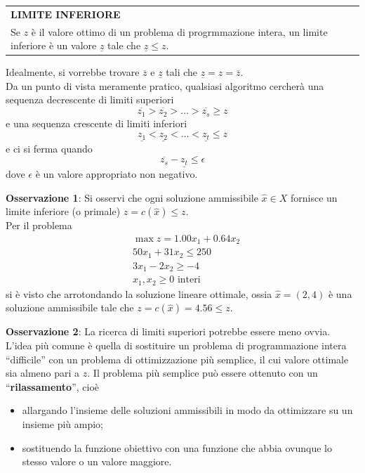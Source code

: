 \documentclass[a4paper]{extarticle}
\newcommand{\quotes}[1]{``#1''}
\renewcommand\arraystretch{}
\begin{document}
\vspace{1em}
\setlength{\tabcolsep}{14pt}
\renewcommand{\arraystretch}{2}
\noindent
\begin{tabularx}{\textwidth}{@{}|P|@{}}
    \hline
    {\textbf{LIMITE INFERIORE}}\\
    \parbox{\linewidth}{Se $z$ è il valore ottimo di un problema di progrmmazione intera, un limite inferiore è un valore $\underline{z}$ tale che $\underline{z} \leq z$. \vspace{3mm}}\\
    \hline
\end{tabularx}

\vspace{1em}
\noindent
Idealmente, si vorrebbe trovare $\overline{z}$ e $\underline{z}$ tali che $\underline{z} = z = \overline{z}$.\\
Da un punto di vista meramente pratico, qualsiasi algoritmo cercherà una sequenza decrescente di limiti superiori
\[\overline{z_1} > \overline{z_2} > \dots > \overline{z_s} \geq z\]
e una sequenza crescente di limiti inferiori 
\[\underline{z_1} < \underline{z_2} < \dots < \underline{z_t} \leq z\]
e ci si ferma quando
\[\overline{z_s} - \underline{z_t} \leq \epsilon\]
dove $\epsilon$ è un valore appropriato non negativo.

\vspace{2em}
\noindent
\textbf{Osservazione 1}: Si osservi che ogni soluzione ammissibile $\hat x \in X$ fornisce un limite inferiore (o primale) $z = c(\hat x) \leq z$.\\
Per il problema
\begin{align*}
    &\max z = 1.00x_1 + 0.64x_2\\
    &50x_1 + 31x_2 \leq 250\\
    &3x_1 - 2x_2 \geq -4\\
    &x_1, x_2 \geq 0 \text{ interi}
\end{align*}
si è visto che arrotondando la soluzione lineare ottimale, ossia $\hat x = (2, 4)$ è una soluzione ammissibile tale che $z = c(\hat x) = 4.56 \leq z$.

\vspace{2em}
\noindent
\textbf{Osservazione 2}: La ricerca di limiti superiori potrebbe essere meno ovvia. L'idea più comune è quella di sostituire un problema di programmazione intera \quotes{difficile} con un problema di ottimizzazione più semplice, il cui valore ottimale sia almeno pari a $z$. Il problema più semplice può essere ottenuto con un \quotes{\textbf{rilassamento}}, cioè 
\begin{itemize}
    \item allargando l'insieme delle soluzioni ammissibili in modo da ottimizzare su un insieme più ampio;
    \item sostituendo la funzione obiettivo con una funzione che abbia ovunque lo stesso valore o un valore maggiore.
\end{itemize}
\end{document}
